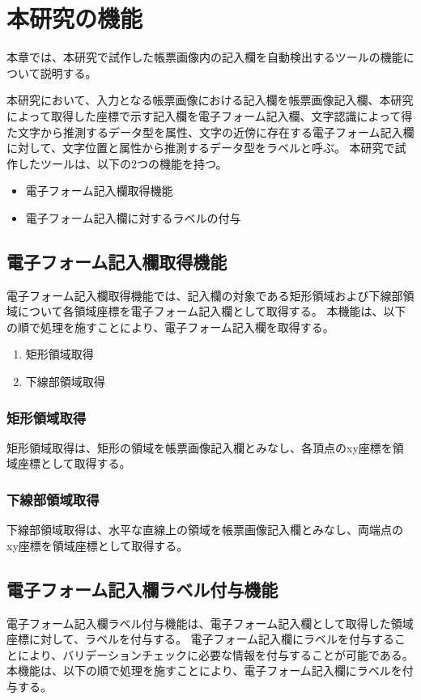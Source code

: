 \chapter{本研究の機能}\label{cha:Function}
本章では、本研究で試作した帳票画像内の記入欄を自動検出するツールの機能について説明する。

本研究において、入力となる帳票画像における記入欄を帳票画像記入欄、本研究によって取得した座標で示す記入欄を電子フォーム記入欄、文字認識によって得た文字から推測するデータ型を属性、文字の近傍に存在する電子フォーム記入欄に対して、文字位置と属性から推測するデータ型をラベルと呼ぶ。
本研究で試作したツールは、以下の2つの機能を持つ。

\begin{itemize}
  \item 電子フォーム記入欄取得機能
  \item 電子フォーム記入欄に対するラベルの付与
\end{itemize}


\section{電子フォーム記入欄取得機能}\label{sec:eform_write_space_obtainment_feature}
電子フォーム記入欄取得機能では、記入欄の対象である矩形領域および下線部領域について各領域座標を電子フォーム記入欄として取得する。
本機能は、以下の順で処理を施すことにより、電子フォーム記入欄を取得する。

\begin{enumerate}
  \item 矩形領域取得
  \item 下線部領域取得
\end{enumerate}

\subsection{矩形領域取得}\label{subsec:rect_coords_obtainment}
矩形領域取得は、矩形の領域を帳票画像記入欄とみなし、各頂点のxy座標を領域座標として取得する。

\subsection{下線部領域取得}\label{subsec:underline_coords_obtainment}
下線部領域取得は、水平な直線上の領域を帳票画像記入欄とみなし、両端点のxy座標を領域座標として取得する。


\section{電子フォーム記入欄ラベル付与機能}\label{sec:label_link}
電子フォーム記入欄ラベル付与機能は、電子フォーム記入欄として取得した領域座標に対して、ラベルを付与する。
電子フォーム記入欄にラベルを付与することにより、バリデーションチェックに必要な情報を付与することが可能である。
本機能は、以下の順で処理を施すことにより、電子フォーム記入欄にラベルを付与する。

